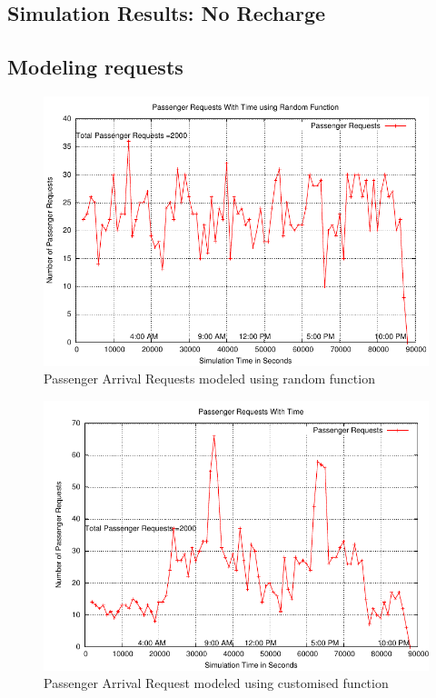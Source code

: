 \documentclass[11pt]{report}
\begin{document}
\begin{itemize}
\section{Simulation Results: No Recharge}

\subsection{ Modeling requests }
\begin{figure}[h!t]
\centering
\includegraphics[scale=0.9]{../plots/passengerArrivalDistribution_old}
\caption{Passenger Arrival Requests modeled using random function}\label{fig:SVM}
\end{figure}

\begin{figure}[h!t]
\centering
\includegraphics[scale=0.9]{../plots/passengerArrivalDistribution_9AM5PM}
\caption{Passenger Arrival Request modeled using customised function}\label{fig:SVM}
\end{figure}
\newpage


\end{itemize}
\end{document}
